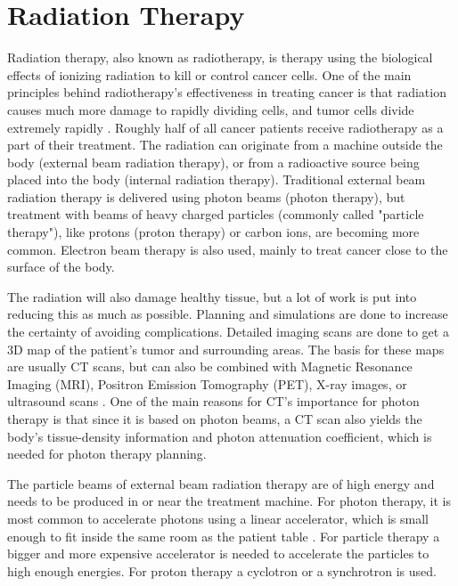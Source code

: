 \documentclass[../main/thesis.tex]{subfiles}
\begin{document}
\newpage
\section{Radiation Therapy}
\label{t-therapy}
Radiation therapy, also known as radiotherapy, is therapy using the biological effects of ionizing radiation to kill or control cancer cells. One of the main principles behind radiotherapy's effectiveness in treating cancer is that radiation causes much more damage to rapidly dividing cells, and tumor cells divide extremely rapidly \citep[chap. 45]{Serway}. Roughly half of all cancer patients receive radiotherapy as a part of their treatment. The radiation can originate from a machine outside the body (external beam radiation therapy), or from a radioactive source being placed into the body (internal radiation therapy). Traditional external beam radiation therapy is delivered using photon beams (photon therapy), but treatment with beams of heavy charged particles (commonly called "particle therapy"), like protons (proton therapy) or carbon ions, are becoming more common. Electron beam therapy is also used, mainly to treat cancer close to the surface of the body. \citep{nih}

The radiation will also damage healthy tissue, but a lot of work is put into reducing this as much as possible. Planning and simulations are done to increase the certainty of avoiding complications. Detailed imaging scans are done to get a 3D map of the patient's tumor and surrounding areas. The basis for these maps are usually \gls{CT} scans, but can also be combined with Magnetic Resonance Imaging (MRI), Positron Emission Tomography (PET), X-ray images, or ultrasound scans \citep{nih}. One of the main reasons for \gls{CT}'s importance for photon therapy is that since it is based on photon beams, a \gls{CT} scan also yields the body's tissue-density information and photon attenuation coefficient, which is needed for photon therapy planning.  \citep[chap. 12]{Khan}

The particle beams of external beam radiation therapy are of high energy and needs to be produced in or near the treatment machine. For photon therapy, it is most common to accelerate photons using a linear accelerator, which is small enough to fit inside the same room as the patient table \citep{nih}. For particle therapy a bigger and more expensive accelerator is needed to accelerate the particles to high enough energies. For proton therapy a cyclotron or a synchrotron is used. \citep[chap. 27]{Khan}
\end{document}
